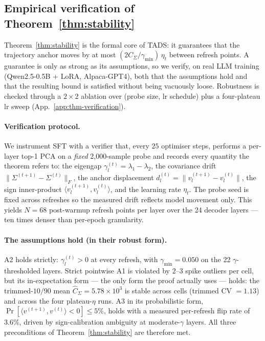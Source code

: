 
\subsection{Empirical verification of Theorem~\ref{thm:stability}}
\label{sec:thm-empirical}

Theorem~\ref{thm:stability} is the formal core of \textsc{TADS}: it
guarantees that the trajectory anchor moves by at most
$(2C_\Sigma/\gamma_{\min})\,\eta_t$ between refresh points. A
guarantee is only as strong as its assumptions, so we verify, on
real LLM training (Qwen2.5-0.5B + LoRA, Alpaca-GPT4), both that the
assumptions hold and that the resulting bound is satisfied without
being vacuously loose. Robustness is checked through a $2{\times}2$
ablation over (probe size, lr schedule) plus a four-plateau lr sweep
(App.~\ref{app:thm-verification}).

\paragraph{Verification protocol.}
We instrument SFT with a verifier that, every $25$ optimiser steps,
performs a per-layer top-1 PCA on a \emph{fixed} 2{,}000-sample probe
and records every quantity the theorem refers to: the eigengap
$\gamma_l^{(t)}=\lambda_1-\lambda_2$, the covariance drift
$\|\Sigma^{(t+1)}-\Sigma^{(t)}\|_F$, the anchor displacement
$d_l^{(t)}=\|v_l^{(t+1)}-v_l^{(t)}\|$, the sign inner-product
$\langle v_l^{(t+1)},v_l^{(t)}\rangle$, and the learning rate
$\eta_t$. The probe seed is fixed across refreshes so the measured
drift reflects model movement only. This yields $N=68$ post-warmup
refresh points per layer over the 24 decoder layers --- ten times
denser than per-epoch granularity.

\paragraph{The assumptions hold (in their robust form).}
A2 holds strictly: $\gamma_l^{(t)}>0$ at every refresh, with
$\gamma_{\min}=0.050$ on the 22 $\gamma$-thresholded layers.
Strict pointwise A1 is violated by $2$--$3$ spike outliers per cell,
but its in-expectation form --- the only form the proof actually
uses --- holds: the trimmed-$10/90$ mean
$\hat{C}_\Sigma=5.78\times 10^{3}$ is stable across cells (trimmed
CV $=1.13$) and across the four plateau-$\eta$ runs. A3 in its
probabilistic form, $\Pr[\langle v^{(t+1)},v^{(t)}\rangle<0]\le 5\%$,
holds with a measured per-refresh flip rate of $3.6\%$, driven by
sign-calibration ambiguity at moderate-$\gamma$ layers. All three
preconditions of Theorem~\ref{thm:stability} are therefore met.

